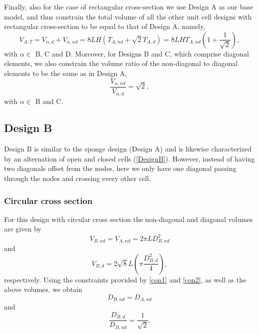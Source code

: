 \documentclass[10pt,twoside]{fernandes_supp}
\begin{document}
Finally, also for the case of rectangular cross-section we use Design A as our base model, and thus constrain the total volume of all the other unit cell designs with rectangular cross-section to be equal to that of Design A, namely,
\begin{equation}\label{con1R}
{V}_{A,T}=V_{\alpha,d}+V_{\alpha,nd}= 8LH(T_{A,nd}+\sqrt{2}T_{A,d})=8LHT_{A,nd}\left(1+\frac{1}{\sqrt{2}}\right),
\end{equation}
with $\alpha\in$ B, C and D.
Moreover, for Designs B and C, which comprise diagonal elements, we also  constrain the volume ratio of the non-diagonal to diagonal elements to be the same as in Design A,
\begin{equation}\label{con2R}
\frac{V_{\alpha,nd}}{V_{\alpha,d}}=\sqrt{2},
\end{equation}
with $\alpha\in$ B and C.

\subsection{Design B}
Design B is similar to the sponge design (Design A) and is likewise characterized by an alternation of open and closed cells (\cref{DesignB}). However, instead of having two diagonals offset from the nodes, here we only have one diagonal passing through the nodes and crossing every other cell. 

\subsubsection{Circular cross section}
For this design with circular cross section the non-diagonal and diagonal volumes are given by
\begin{equation}
V_{B,nd}=V_{A,nd}=2\pi L D_{B,nd}^2
\end{equation}
and
\begin{equation}
V_{B,d}=2\sqrt{8} L \left(\pi \frac{{D}_{B,d}^2}{4}\right),
\end{equation}
respectively.
Using the constraints provided by \cref{con1} and \cref{con2}, as well as the above volumes, we  obtain 
\begin{equation}
{{D}_{B,nd}}={{D}_{A,nd}}
\end{equation}
and
\begin{equation}
\frac{{D}_{B,d}}{{D}_{B,nd}}=\frac{1}{\sqrt{2}}.
\end{equation}
\end{document}
